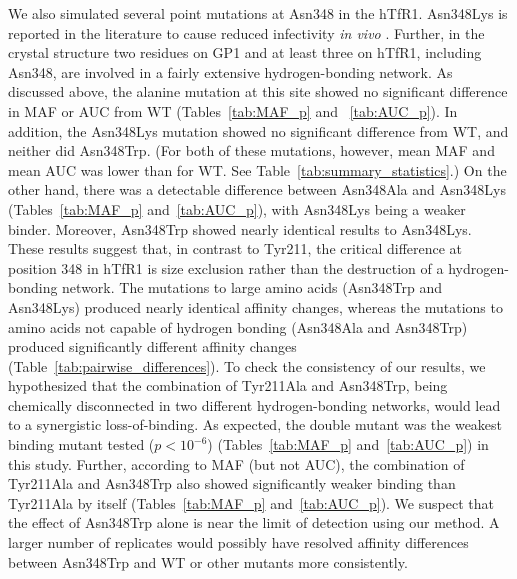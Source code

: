 \documentclass[12pt]{article}
\begin{document}
We also simulated several point mutations at Asn348 in the hTfR1. Asn348Lys is reported in the literature to cause reduced infectivity \textit{in vivo} \citep{Rad2008,Abraham2010}. Further, in the crystal structure two residues on GP1 and at least three on hTfR1, including Asn348, are involved in a fairly extensive hydrogen-bonding network. As discussed above, the alanine mutation at this site showed no significant difference in MAF or AUC from WT (Tables~\ref{tab:MAF_p} and ~\ref{tab:AUC_p}). In addition, the Asn348Lys mutation showed no significant difference from WT, and neither did Asn348Trp. (For both of these mutations, however, mean MAF and mean AUC was lower than for WT. See Table~\ref{tab:summary_statistics}.)  On the other hand, there was a detectable difference between Asn348Ala and Asn348Lys (Tables~\ref{tab:MAF_p} and~\ref{tab:AUC_p}), with Asn348Lys being a weaker binder. Moreover, Asn348Trp showed nearly identical results to Asn348Lys. These results suggest that, in contrast to Tyr211, the critical difference at position 348 in hTfR1 is size exclusion rather than the destruction of a hydrogen-bonding network. The mutations to large amino acids (Asn348Trp and Asn348Lys) produced nearly identical affinity changes, whereas the mutations to amino acids not capable of hydrogen bonding (Asn348Ala and Asn348Trp) produced significantly different affinity changes (Table~\ref{tab:pairwise_differences}). To check the consistency of our results, we hypothesized that the combination of Tyr211Ala and Asn348Trp, being chemically disconnected in two different hydrogen-bonding networks, would lead to a synergistic loss-of-binding. As expected, the double mutant was the weakest binding mutant tested ($ p < 10^{-6} $) (Tables~\ref{tab:MAF_p} and~\ref{tab:AUC_p}) in this study. Further, according to MAF (but not AUC), the combination of Tyr211Ala and Asn348Trp also showed significantly weaker binding than Tyr211Ala by itself (Tables~\ref{tab:MAF_p} and~\ref{tab:AUC_p}). We suspect that the effect of Asn348Trp alone is near the limit of detection using our method. A larger number of replicates would possibly have resolved affinity differences between Asn348Trp and WT or other mutants more consistently.
\end{document}
